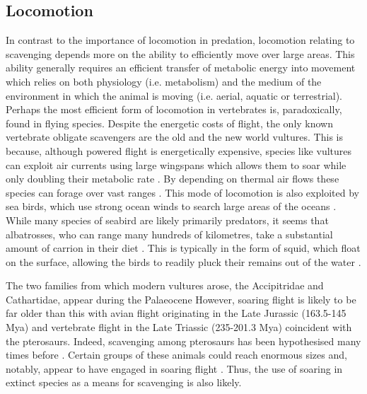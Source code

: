 \documentclass[a4paper,12pt]{article}
\begin{document}
\subsection*{Locomotion}
In contrast to the importance of locomotion in predation, locomotion relating to scavenging depends more on the ability to efficiently move over large areas. 
This ability generally requires an efficient transfer of metabolic energy into movement which relies on both physiology (i.e. metabolism) and the medium of the environment in which the animal is moving (i.e. aerial, aquatic or terrestrial).
Perhaps the most efficient form of locomotion in vertebrates is, paradoxically, found in flying species. 
Despite the energetic costs of flight, the only known vertebrate obligate scavengers are the old and the new world vultures. 
This is because, although powered flight is energetically expensive, species like vultures can exploit air currents using large wingspans which allows them to soar while only doubling their metabolic rate \citep{hedenstrom1993migration,spivey2014analysing}. %
By depending on thermal air flows these species can forage over vast ranges \citep{spiegel2013factors}. 
This mode of locomotion is also exploited by sea birds, which use strong ocean winds to search large areas of the oceans \citep{norberg2012vertebrate,thaxter2012seabird}. 
While many species of seabird are likely primarily predators, it seems that albatrosses, who can range many hundreds of kilometres, take a substantial amount of carrion in their diet \citep{croxall1994dead}. 
This is typically in the form of squid, which float on the surface, allowing the birds to readily pluck their remains out of the water \citep{croxall1994dead}. 

The two families from which modern vultures arose, the Accipitridae and Cathartidae, appear during the Palaeocene \citep[66 - 56 Million years ago (Mya); ][]{Jetz2012, Jarvis2014} %
However, soaring flight is likely to be far older than this with avian flight originating in the Late Jurassic (163.5-145 Mya) and vertebrate flight in the Late Triassic (235-201.3 Mya) coincident with the pterosaurs. 
Indeed, scavenging among pterosaurs has been hypothesised many times before \citep{witton2008reappraisal}. 
Certain groups of these animals could reach enormous sizes \citep[e.g. Azhdarchids with wingspans of 11 metres; ][]{witton2010size} and, notably, appear to have engaged in soaring flight \citep{witton2010size}.
Thus, the use of soaring in extinct species as a means for scavenging is also likely. 
\end{document}
